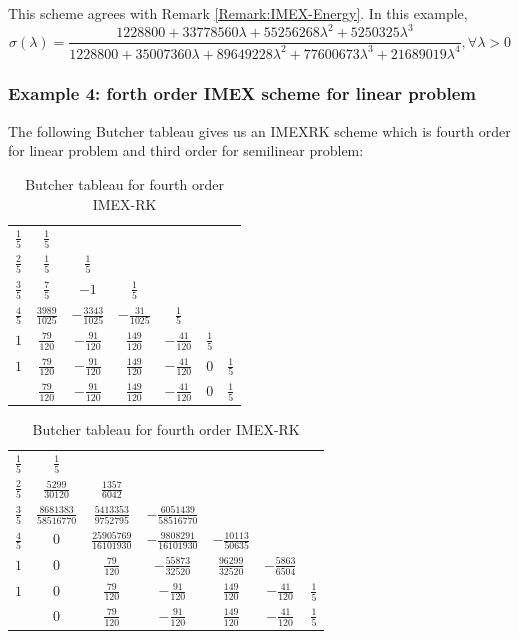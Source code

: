 This scheme agrees with Remark \ref{Remark:IMEX-Energy}. 
In this example,
$$\sigma(\lambda) = \frac{1228800+ 33778560\lambda + 55256268 \lambda^2 + 5250325\lambda^3 }
{1228800+ 35007360\lambda + 89649228 \lambda^2 + 77600673\lambda^3 +21689019\lambda^4}, \forall \lambda > 0$$

\subsubsection{Example 4: forth order IMEX scheme for linear problem}

 The following Butcher tableau gives us an IMEXRK scheme 
 which is fourth order for linear problem and third order for semilinear problem:
 \linespread{1.5}
 \begin{table}[h]
     \centering
     \begin{tabular}[h]{c|cccccc}
         $\frac{1}{5}$ & $\frac{1}{5}$ \\
         $\frac{2}{5}$ & $\frac{1}{5}$&$\frac{1}{5}$\\
         $\frac{3}{5}$ & $\frac{7}{5}$&$-1$&$\frac{1}{5}$\\
         $\frac{4}{5}$ & $\frac{3989}{1025}$&$-\frac{3343}{1025}$&$-\frac{31}{1025}$&$\frac{1}{5}$\\
         $1$ & $\frac{79}{120}$&$-\frac{91}{120}$&$\frac{149}{120}$&$-\frac{41}{120}$&$\frac{1}{5}$\\
         $1$ & $\frac{79}{120}$&$-\frac{91}{120}$&$\frac{149}{120}$&$-\frac{41}{120}$&$0$ &$\frac{1}{5}$\\
         \hline
         ~ & $\frac{79}{120}$&$-\frac{91}{120}$&$\frac{149}{120}$&$-\frac{41}{120}$&$0$ &$\frac{1}{5}$\\
     \end{tabular}
     \begin{tabular}[h]{c|cccccc}
         $\frac{1}{5}$ & $\frac{1}{5}$ \\
         $\frac{2}{5}$ & $\frac{5299}{30120}$&$\frac{1357}{6042}$\\
         $\frac{3}{5}$ & $\frac{8681383}{58516770}$&$\frac{5413353}{9752795}$&$-\frac{6051439}{58516770}$\\
         $\frac{4}{5}$ & $0$&$\frac{25905769}{16101930}$&$-\frac{9808291}{16101930}$&$-\frac{10113}{50635}$\\
         $1$&$0$ & $\frac{79}{120}$&$-\frac{55873}{32520}$&$\frac{96299}{32520}$&$-\frac{5863}{6504}$\\
         $1$ &$0$ &$\frac{79}{120}$&$-\frac{91}{120}$&$\frac{149}{120}$&$-\frac{41}{120}$ &$\frac{1}{5}$\\
         \hline
         ~ &$0$ &$\frac{79}{120}$&$-\frac{91}{120}$&$\frac{149}{120}$&$-\frac{41}{120}$ &$\frac{1}{5}$\\
     \end{tabular}
     \caption{{Butcher tableau for fourth order IMEX-RK}}
 \end{table}

